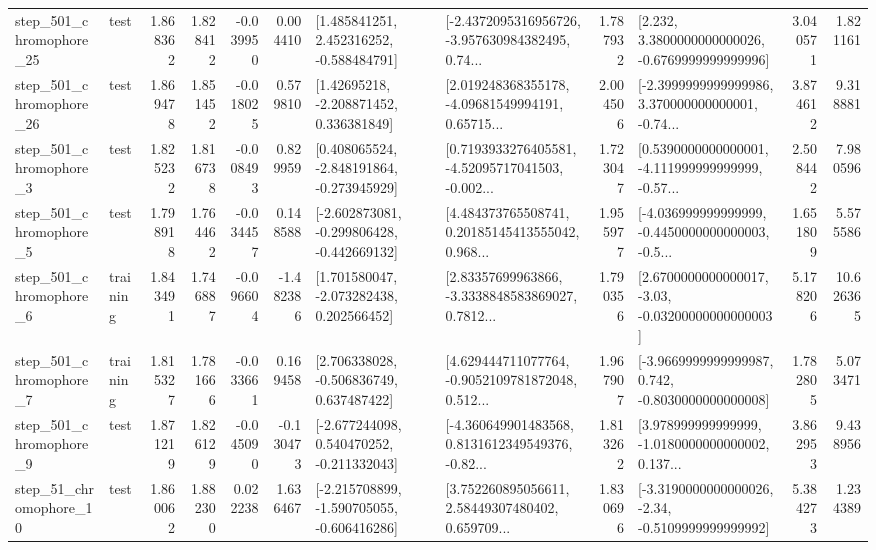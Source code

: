 \begin{tabular}{llrrrrllrlrr}
  step\_501\_chromophore\_25 &      test &      1.868362 &    1.828412 &     -0.039950 &  0.004410 &    [1.485841251, 2.452316252, -0.588484791] &  [-2.4372095316956726, -3.957630984382495, 0.74... &       1.787932 &   [2.232, 3.3800000000000026, -0.6769999999999996] &            3.040571 &          1.821161 \\
  step\_501\_chromophore\_26 &      test &      1.869478 &    1.851452 &     -0.018025 &  0.579810 &     [1.42695218, -2.208871452, 0.336381849] &  [2.019248368355178, -4.09681549994191, 0.65715... &       2.004506 &  [-2.3999999999999986, 3.370000000000001, -0.74... &            3.874612 &          9.318881 \\
   step\_501\_chromophore\_3 &      test &      1.825232 &    1.816738 &     -0.008493 &  0.829959 &   [0.408065524, -2.848191864, -0.273945929] &  [0.7193933276405581, -4.52095717041503, -0.002... &       1.723047 &  [0.5390000000000001, -4.111999999999999, -0.57... &            2.508442 &          7.980596 \\
   step\_501\_chromophore\_5 &      test &      1.798918 &    1.764462 &     -0.034457 &  0.148588 &  [-2.602873081, -0.299806428, -0.442669132] &  [4.484373765508741, 0.20185145413555042, 0.968... &       1.955977 &  [-4.036999999999999, -0.4450000000000003, -0.5... &            1.651809 &          5.575586 \\
   step\_501\_chromophore\_6 &  training &      1.843491 &    1.746887 &     -0.096604 & -1.482386 &    [1.701580047, -2.073282438, 0.202566452] &  [2.83357699963866, -3.3338848583869027, 0.7812... &       1.790356 &  [2.6700000000000017, -3.03, -0.03200000000000003] &            5.178206 &         10.626365 \\
   step\_501\_chromophore\_7 &  training &      1.815327 &    1.781666 &     -0.033661 &  0.169458 &    [2.706338028, -0.506836749, 0.637487422] &  [4.629444711077764, -0.9052109781872048, 0.512... &       1.967907 &  [-3.9669999999999987, 0.742, -0.8030000000000008] &            1.782805 &          5.073471 \\
   step\_501\_chromophore\_9 &      test &      1.871219 &    1.826129 &     -0.045090 & -0.130473 &   [-2.677244098, 0.540470252, -0.211332043] &  [-4.360649901483568, 0.8131612349549376, -0.82... &       1.813262 &  [3.978999999999999, -1.0180000000000002, 0.137... &            3.862953 &          9.438956 \\
   step\_51\_chromophore\_10 &      test &      1.860062 &    1.882300 &      0.022238 &  1.636467 &  [-2.215708899, -1.590705055, -0.606416286] &  [3.752260895056611, 2.58449307480402, 0.659709... &       1.830696 &  [-3.3190000000000026, -2.34, -0.5109999999999992] &            5.384273 &          1.234389 \\

\end{tabular}
